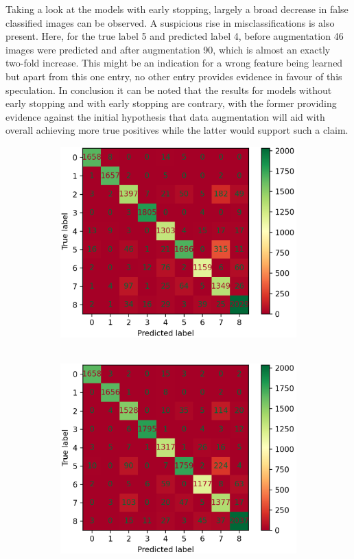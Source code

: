 Taking a look at the models with early stopping, largely a broad decrease in false classified images can be observed. A suspicious rise in misclassifications is also present. Here, for the true label 5 and  predicted label 4, before augmentation 46 images were predicted and after augmentation 90, which is almost an exactly two-fold increase. This might be an indication for a wrong feature being learned but apart from this one entry, no other entry provides evidence in favour of this speculation. In conclusion it can be noted that the results for models without early stopping and with early stopping are contrary, with the former providing evidence against the initial hypothesis that data augmentation will aid with overall achieving more true positives while the latter would support such a claim.
\begin{figure}[ht]
	\centering
	\begin{subfigure}{0.49\columnwidth}
		\includegraphics[width=\columnwidth]{./figures/Alex_4_with_balancing_conf_matrix_cropped.png}
		~\label{fig:noaugmentationearly}
	\end{subfigure}
	\begin{subfigure}{0.49\columnwidth}
		\includegraphics[width=\columnwidth]{./figures/Alex_4_with_augment_conf_matrix_cropped.png}

\end{subfigure}
\end{figure}
